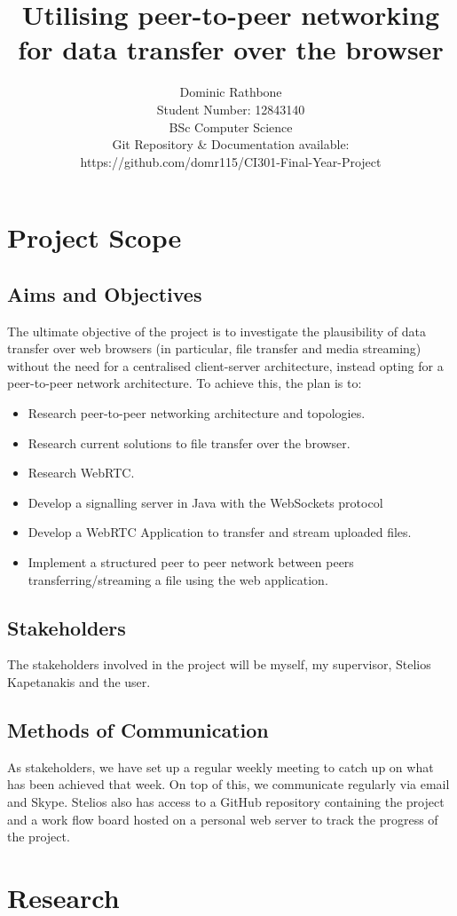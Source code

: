 \documentclass[]{report}
\title{Utilising peer-to-peer networking for data transfer over the browser}
\author{
	 Dominic Rathbone
	 \\ Student Number: 12843140 
	 \\ BSc Computer Science 
	 \\ Git Repository \& Documentation available: 
	 \\	https://github.com/domr115/CI301-Final-Year-Project 
}
\begin{document}
\maketitle
\tableofcontents

\chapter{Project Scope}
\section{Aims and Objectives}
	The ultimate objective of the project is to investigate the plausibility of data transfer over web browsers (in particular, file transfer and media streaming) without the need for a centralised client-server architecture, instead opting for a peer-to-peer network architecture. To achieve this, the plan is to:
	\begin{itemize}
		\item Research peer-to-peer networking architecture and topologies.
		\item Research current solutions to file transfer over the browser.
		\item Research WebRTC.
		\item Develop a signalling server in Java with the WebSockets protocol
		\item Develop a WebRTC Application to transfer and stream uploaded files.
		\item Implement a structured peer to peer network between peers transferring/streaming a file using the web application.
	\end{itemize}
\section{Stakeholders}
	The stakeholders involved in the project will be myself, my supervisor, Stelios Kapetanakis and the user.
\section{Methods of Communication}
	As stakeholders, we have set up a regular weekly meeting to catch up on what has been achieved that week. On top of this, we communicate regularly via email and Skype. Stelios also has access to a GitHub repository containing the project and a work flow board hosted on a personal web server to track the progress of the project. 
	
\chapter{Research}
	
\end{document}
